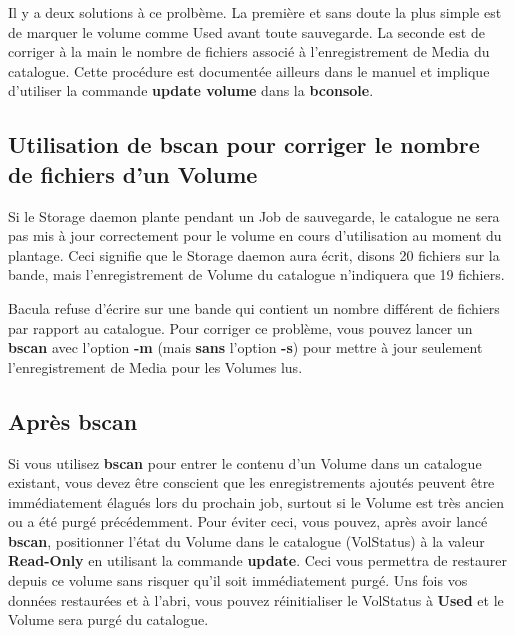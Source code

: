 Il y a deux solutions à ce prolbème. La première et sans doute la plus simple
est de marquer le volume comme Used avant toute sauvegarde. La seconde est de
corriger à la main le nombre de fichiers associé à l'enregistrement de Media du
catalogue. Cette procédure est documentée ailleurs dans le manuel et implique
d'utiliser la commande {\bf update volume} dans la {\bf bconsole}.

\subsection{Utilisation de bscan pour corriger le nombre de fichiers d'un Volume}

Si le Storage daemon plante pendant un Job de sauvegarde, le catalogue ne sera
pas mis à jour correctement pour le volume en cours d'utilisation au moment
du plantage. Ceci signifie que le Storage daemon aura écrit, disons 20 fichiers
sur la bande, mais l'enregistrement de Volume du catalogue n'indiquera que 19
fichiers. 

Bacula refuse d'écrire sur une bande qui contient un nombre différent de 
fichiers par rapport au catalogue. Pour corriger ce problème, vous pouvez lancer
un {\bf bscan} avec l'option {\bf -m} (mais {\bf sans} l'option {\bf -s}) pour
mettre à jour seulement l'enregistrement de Media pour les Volumes lus.

\subsection{Après bscan}

Si vous utilisez {\bf bscan} pour entrer le contenu d'un Volume dans un 
catalogue existant, vous devez être conscient que les enregistrements ajoutés
peuvent être immédiatement élagués lors du prochain job, surtout si le Volume
est très ancien ou a été purgé précédemment. Pour éviter ceci, vous pouvez, 
après avoir lancé {\bf bscan}, positionner l'état du Volume dans le catalogue 
(VolStatus) à la valeur {\bf Read-Only} en utilisant la commande {\bf update}.
Ceci vous permettra de restaurer depuis ce volume sans risquer qu'il soit 
immédiatement purgé. Uns fois vos données restaurées et à l'abri, vous pouvez
réinitialiser le VolStatus à {\bf Used} et le Volume sera purgé du catalogue. 

